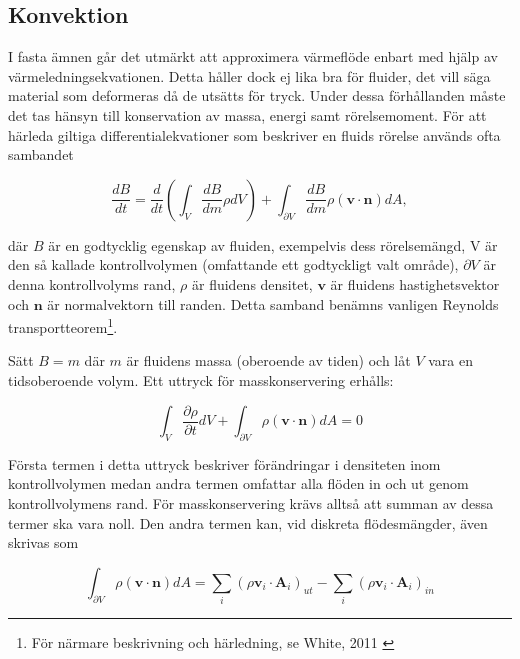 \subsection{Konvektion}
\label{section:convection}
I fasta ämnen går det utmärkt att approximera värmeflöde enbart med hjälp
av värmeledningsekvationen. Detta håller dock ej lika bra för fluider, det vill säga
material som deformeras då de utsätts för tryck.
Under dessa förhållanden
måste det tas hänsyn till konservation av massa, energi samt rörelsemoment.
För att härleda giltiga differentialekvationer som beskriver en fluids rörelse används ofta sambandet

\begin{equation}
\label{eq:convection:reynolds}
\frac{dB}{dt} = \frac{d}{dt}\left( \int_{V} \frac{dB}{dm} \rho dV \right) + \int_{\partial V} \frac{dB}{dm} \rho \left( \mathbf{v} \cdot \mathbf{n} \right)dA,
\end{equation}

där $B$ är en godtycklig egenskap av fluiden, exempelvis dess rörelsemängd, V är den så kallade kontrollvolymen (omfattande ett godtyckligt valt område), $\partial V$ är denna kontrollvolyms rand, $\rho$ är fluidens densitet, $\mathbf{v}$ är fluidens hastighetsvektor och $\mathbf{n}$ är normalvektorn till randen. Detta samband benämns vanligen Reynolds transportteorem\footnote{För närmare beskrivning och härledning, se White, 2011 \cite{white11}}.

Sätt $B = m$ där $m$ är fluidens massa (oberoende av tiden) och låt $V$ vara en tidsoberoende volym. Ett uttryck för masskonservering erhålls:

\begin{equation}
\label{eq:convection:masscon}
\int_V \frac{\partial \rho}{\partial t} dV + \int_{\partial V} \rho \left( \mathbf{v} \cdot \mathbf{n} \right) dA = 0
\end{equation}

Första termen i detta uttryck beskriver förändringar i densiteten inom kontrollvolymen medan andra termen omfattar alla flöden in och ut genom kontrollvolymens rand. För masskonservering krävs alltså att summan av dessa termer ska vara noll. Den andra termen kan, vid diskreta flödesmängder, även skrivas som

\begin{equation}
\label{eq:convection:discrete}
\int_{\partial V} \rho \left( \mathbf{v} \cdot \mathbf{n} \right) dA = \sum_i \left( \rho \mathbf{v}_i\cdot \mathbf{A}_i \right)_{ut} - \sum_i \left( \rho \mathbf{v}_i\cdot \mathbf{A}_i \right)_{in}
\end{equation}

